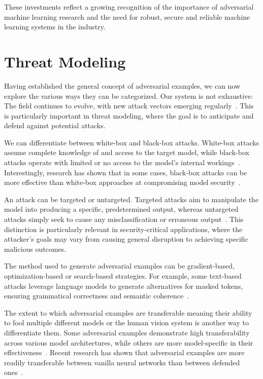 \documentclass[a4paper, oneside]{discothesis}
\begin{document}
These investments reflect a growing recognition of the importance of adversarial machine learning research and the need for robust, secure and reliable machine learning systems in the industry.

\section{Threat Modeling}

Having established the general concept of adversarial examples, we can now explore the various ways they can be categorized. Our system is not exhaustive: The field continues to evolve, with new attack vectors emerging regularly~\cite{Khaleel2024AdversarialAI}. This is particularly important in threat modeling, where the goal is to anticipate and defend against potential attacks.

We can differentiate between white-box and black-box attacks. White-box attacks assume complete knowledge of and access to the target model, while black-box attacks operate with limited or no access to the model's internal workings~\cite{capozzi2024adversarial}. Interestingly, research has shown that in some cases, black-box attacks can be more effective than white-box approaches at compromising model security~\cite{capozzi2024adversarial}.

An attack can be targeted or untargeted. Targeted attacks aim to manipulate the model into producing a specific, predetermined output, whereas untargeted attacks simply seek to cause any misclassification or erroneous output~\cite{capozzi2024adversarial, Kashyap2024AdversarialAA}. This distinction is particularly relevant in security-critical applications, where the attacker's goals may vary from causing general disruption to achieving specific malicious outcomes.

The method used to generate adversarial examples can be gradient-based, optimization-based or search-based strategies. For example, some text-based attacks leverage language models to generate alternatives for masked tokens, ensuring grammatical correctness and semantic coherence~\cite{garg2020bae}.

The extent to which adversarial examples are transferable \textendash{} meaning their ability to fool multiple different models or the human vision system\cite{elsayed2018adversarial} \textendash{} is another way to differentiate them. Some adversarial examples demonstrate high transferability across various model architectures, while others are more model-specific in their effectiveness~\cite{Li2022ASO, li2022review}. Recent research has shown that adversarial examples are more readily transferable between vanilla neural networks than between defended ones~\cite{li2019nattack, zheng2023black}.
\end{document}
